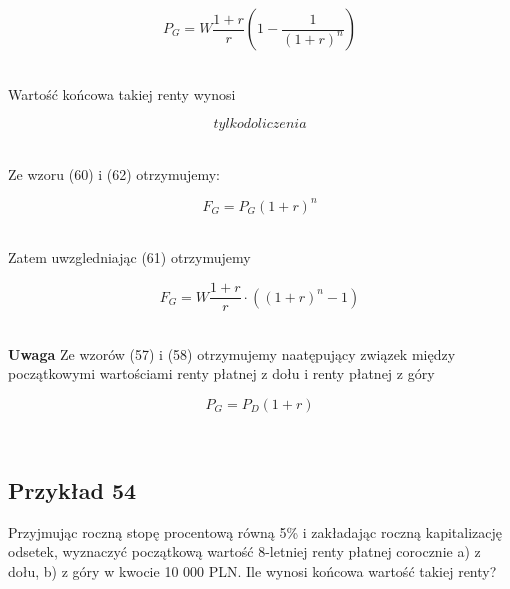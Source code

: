 \documentclass{article}
\begin{document}
\begin{center}
	\begin{equation}
		P_G = W\frac{1 + r}{r}(1 - \frac{1}{(1 + r)^n})
	\end{equation}
\end{center}\\ 

Wartość końcowa takiej renty wynosi

\begin{center}
	\begin{equation}
		tylko do liczenia
	\end{equation}
\end{center}\\ 

Ze wzoru (60) i (62) otrzymujemy:

\begin{center}
	\begin{equation}
		F_G = P_G(1 + r)^n
	\end{equation}
\end{center}\\ 

Zatem uwzgledniając (61) otrzymujemy

\begin{center}
	\begin{equation}
		F_G = W\frac{1 + r}{r} \cdot ((1 + r)^n - 1)
	\end{equation}
\end{center}\\ 

\textbf{Uwaga} Ze wzorów (57) i (58) otrzymujemy naatępujący związek między początkowymi wartościami renty płatnej z dołu i renty płatnej z góry

\begin{center}
	\begin{equation}
		P_G = P_D(1 + r)
	\end{equation}
\end{center}\\ 

\subsection{Przykład 54}

Przyjmując roczną stopę procentową równą 5\% i zakładając roczną kapitalizację odsetek, wyznaczyć początkową wartość 8-letniej renty płatnej corocznie a) z dołu, b) z góry w kwocie 10 000 PLN. Ile wynosi końcowa wartość takiej renty?\\
\end{document}

